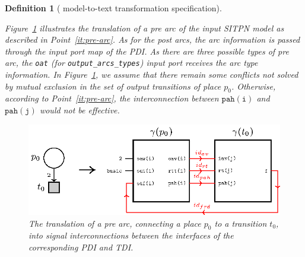 \documentclass[pdflatex,sn-mathphys]{sn-jnl}%
\theoremstyle{thmstyleone}%
\theoremstyle{thmstyletwo}%
\theoremstyle{thmstylethree}%
\newtheorem{definition}{Definition}%
\begin{document}
\begin{definition}[\hilecop{} model-to-text transformation specification]
\begin{enumerate}[resume]
  \end{enumerate}

  \bigskip
  
  Figure~\ref{fig:gen-pre-arc} illustrates the translation of a pre
  arc of the input SITPN model as described in Point~\ref{it:pre-arc}.
  As for the post arcs, the arc information is passed through the
  input port map of the PDI. As there are three possible types of pre
  arc, the \texttt{oat} (for \texttt{output\_arcs\_types}) input port
  receives the arc type information.  In Figure~\ref{fig:gen-pre-arc},
  we assume that there remain some conflicts not solved by mutual
  exclusion in the set of output transitions of place
  $p_0$. Otherwise, according to Point~\ref{it:pre-arc}, the
  interconnection between $\mathtt{pah(i)}$ and $\mathtt{pah(j)}$
  would not be effective.
  
  \begin{figure}[h]
    \centering
    \includegraphics[keepaspectratio,width=.8\textwidth]{gen-pre-arc.eps}
    \caption{The translation of a pre arc, connecting a place $p_0$ to
      a transition $t_0$, into signal interconnections between the
      interfaces of the corresponding PDI and TDI. }
    \label{fig:gen-pre-arc}
  \end{figure}


\end{definition}
\end{document}
